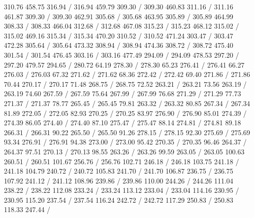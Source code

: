{ 310.76 458.75 316.94 /
 316.94 459.79 309.30 /
 309.30 460.83 311.16 /
 311.16 461.87 309.30 /
 309.30 462.91 305.68 /
 305.68 463.95 305.89 /
 305.89 464.99 308.33 /
 308.33 466.04 312.68 /
 312.68 467.08 315.23 /
 315.23 468.12 315.02 /
 315.02 469.16 315.34 /
 315.34 470.20 310.52 /
 310.52 471.24 303.47 /
 303.47 472.28 305.64 /
 305.64 473.32 308.94 /
 308.94 474.36 308.72 /
 308.72 475.40 301.54 /
 301.54 476.45 303.16 /
 303.16 477.49 294.09 /
 294.09 478.53 297.20 /
 297.20 479.57 294.65 /
\setsolid
{} 280.72 64.19 278.30 /
 278.30 65.23 276.41 /
 276.41 66.27 276.03 /
 276.03 67.32 271.62 /
 271.62 68.36 272.42 /
 272.42 69.40 271.86 /
 271.86 70.44 270.17 /
 270.17 71.48 268.75 /
 268.75 72.52 263.21 /
 263.21 73.56 263.19 /
 263.19 74.60 267.59 /
 267.59 75.64 267.99 /
 267.99 76.68 271.29 /
 271.29 77.73 271.37 /
 271.37 78.77 265.45 /
 265.45 79.81 263.32 /
 263.32 80.85 267.34 /
 267.34 81.89 272.05 /
 272.05 82.93 270.25 /
 270.25 83.97 276.90 /
 276.90 85.01 274.39 /
 274.39 86.05 274.40 /
 274.40 87.10 275.47 /
 275.47 88.14 274.81 /
 274.81 89.18 266.31 /
 266.31 90.22 265.50 /
 265.50 91.26 278.15 /
 278.15 92.30 275.69 /
 275.69 93.34 276.91 /
 276.91 94.38 273.00 /
 273.00 95.42 270.35 /
 270.35 96.46 264.37 /
 264.37 97.51 270.13 /
 270.13 98.55 263.26 /
 263.26 99.59 263.05 /
 263.05 100.63 260.51 /
 260.51 101.67 256.76 /
 256.76 102.71 246.18 /
 246.18 103.75 241.18 /
 241.18 104.79 240.72 /
 240.72 105.83 241.70 /
 241.70 106.87 236.75 /
 236.75 107.92 241.12 /
 241.12 108.96 239.86 /
 239.86 110.00 244.26 /
 244.26 111.04 238.22 /
 238.22 112.08 233.24 /
 233.24 113.12 233.04 /
 233.04 114.16 230.95 /
 230.95 115.20 237.54 /
 237.54 116.24 242.72 /
 242.72 117.29 250.83 /
 250.83 118.33 247.44 /
}
